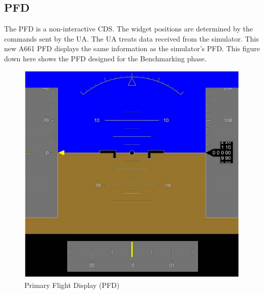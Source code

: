     \subsection{PFD}
        The PFD is a non-interactive CDS. The widget positions are determined by the commands sent by the UA. The UA
        treats data received from the simulator. This new A661 PFD displays the same information as the simulator’s PFD. 
        This figure down here shows the PFD designed for the Benchmarking phase. 
        \begin{figure}[H]
            \centering
            \includegraphics[width=0.6\linewidth]{img/PFD.PNG}
            \caption{Primary Flight Display (PFD)}
        \end{figure}
